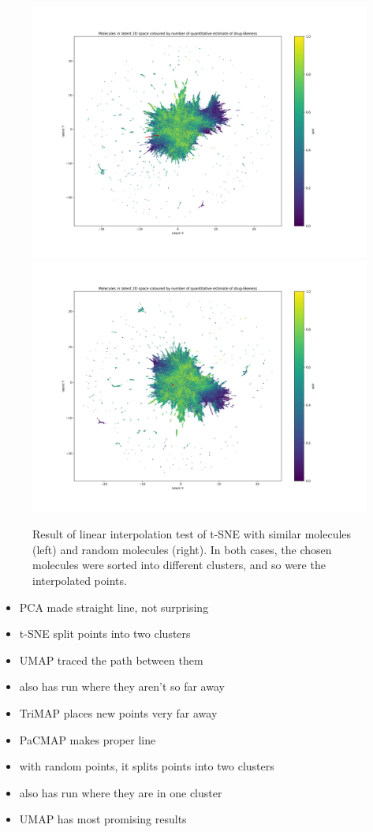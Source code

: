 \begin{figure}[h]
	\centering
	\includegraphics[width=0.5\columnwidth]{figures/PaCMAP_LERP_coxib}
	\includegraphics[width=0.5\columnwidth]{figures/PaCMAP_LERP_random}
	\caption{Result of linear interpolation test of t-SNE with similar molecules (left) and random molecules (right). In both cases, the chosen molecules were sorted into different clusters, and so were the interpolated points.}
	\label{fig:pacmap:lerp}
\end{figure}


\begin{itemize}
	\item PCA made straight line, not surprising
	\item t-SNE split points into two clusters
	\item UMAP traced the path between them
	\item also has run where they aren't so far away
	\item TriMAP places new points very far away
	\item PaCMAP makes proper line
	\item with random points, it splits points into two clusters
	\item also has run where they are in one cluster
	\item UMAP has most promising results
\end{itemize}



